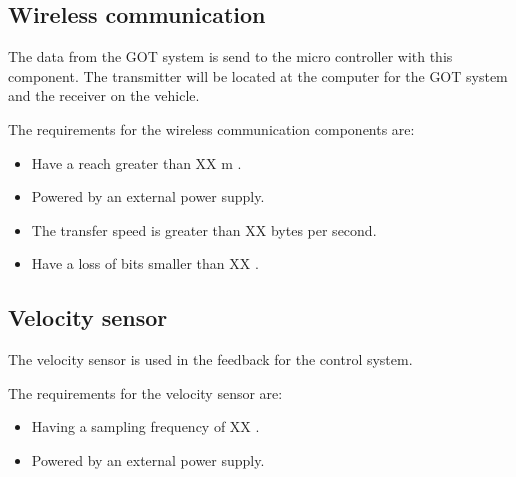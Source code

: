 \subsection{Wireless communication}
The data from the GOT system is send to the micro controller with this component. The transmitter will be located at the computer for the GOT system and the receiver on the vehicle.

The requirements for the wireless communication components are:
\begin{itemize}
\item Have a reach greater than XX m .
\item Powered by an external power supply.
\item The transfer speed is greater than XX bytes per second. 
\item Have a loss of bits smaller than XX .
\end{itemize}


\subsection{Velocity sensor}
The velocity sensor is used in the feedback for the control system.

The requirements for the velocity sensor are:
\begin{itemize}
\item Having a sampling frequency of XX .
\item Powered by an external power supply.
\end{itemize}

%
%
%
%
%
%
%
%
%

